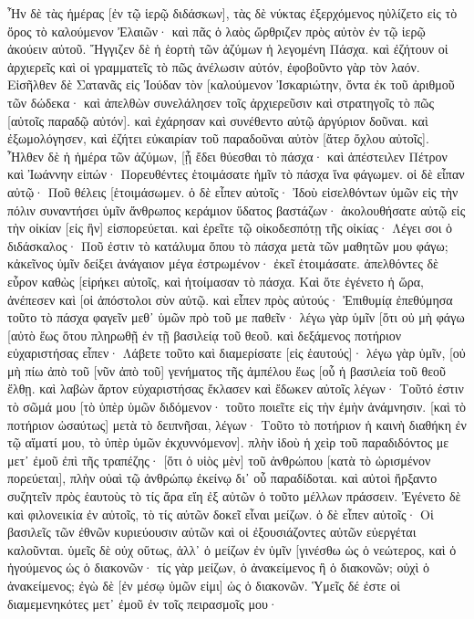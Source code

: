 Ἦν δὲ τὰς ἡμέρας [ἐν τῷ ἱερῷ διδάσκων], τὰς δὲ νύκτας ἐξερχόμενος ηὐλίζετο εἰς τὸ ὄρος τὸ καλούμενον Ἐλαιῶν· 
καὶ πᾶς ὁ λαὸς ὤρθριζεν πρὸς αὐτὸν ἐν τῷ ἱερῷ ἀκούειν αὐτοῦ. 
Ἤγγιζεν δὲ ἡ ἑορτὴ τῶν ἀζύμων ἡ λεγομένη Πάσχα. 
καὶ ἐζήτουν οἱ ἀρχιερεῖς καὶ οἱ γραμματεῖς τὸ πῶς ἀνέλωσιν αὐτόν, ἐφοβοῦντο γὰρ τὸν λαόν. 
Εἰσῆλθεν δὲ Σατανᾶς εἰς Ἰούδαν τὸν [καλούμενον Ἰσκαριώτην, ὄντα ἐκ τοῦ ἀριθμοῦ τῶν δώδεκα· 
καὶ ἀπελθὼν συνελάλησεν τοῖς ἀρχιερεῦσιν καὶ στρατηγοῖς τὸ πῶς [αὐτοῖς παραδῷ αὐτόν]. 
καὶ ἐχάρησαν καὶ συνέθεντο αὐτῷ ἀργύριον δοῦναι. 
καὶ ἐξωμολόγησεν, καὶ ἐζήτει εὐκαιρίαν τοῦ παραδοῦναι αὐτὸν [ἄτερ ὄχλου αὐτοῖς]. 
Ἦλθεν δὲ ἡ ἡμέρα τῶν ἀζύμων, [ᾗ ἔδει θύεσθαι τὸ πάσχα· 
καὶ ἀπέστειλεν Πέτρον καὶ Ἰωάννην εἰπών· Πορευθέντες ἑτοιμάσατε ἡμῖν τὸ πάσχα ἵνα φάγωμεν. 
οἱ δὲ εἶπαν αὐτῷ· Ποῦ θέλεις [ἑτοιμάσωμεν. 
ὁ δὲ εἶπεν αὐτοῖς· Ἰδοὺ εἰσελθόντων ὑμῶν εἰς τὴν πόλιν συναντήσει ὑμῖν ἄνθρωπος κεράμιον ὕδατος βαστάζων· ἀκολουθήσατε αὐτῷ εἰς τὴν οἰκίαν [εἰς ἣν] εἰσπορεύεται. 
καὶ ἐρεῖτε τῷ οἰκοδεσπότῃ τῆς οἰκίας· Λέγει σοι ὁ διδάσκαλος· Ποῦ ἐστιν τὸ κατάλυμα ὅπου τὸ πάσχα μετὰ τῶν μαθητῶν μου φάγω; 
κἀκεῖνος ὑμῖν δείξει ἀνάγαιον μέγα ἐστρωμένον· ἐκεῖ ἑτοιμάσατε. 
ἀπελθόντες δὲ εὗρον καθὼς [εἰρήκει αὐτοῖς, καὶ ἡτοίμασαν τὸ πάσχα. 
Καὶ ὅτε ἐγένετο ἡ ὥρα, ἀνέπεσεν καὶ [οἱ ἀπόστολοι σὺν αὐτῷ. 
καὶ εἶπεν πρὸς αὐτούς· Ἐπιθυμίᾳ ἐπεθύμησα τοῦτο τὸ πάσχα φαγεῖν μεθ᾽ ὑμῶν πρὸ τοῦ με παθεῖν· 
λέγω γὰρ ὑμῖν [ὅτι οὐ μὴ φάγω [αὐτὸ ἕως ὅτου πληρωθῇ ἐν τῇ βασιλείᾳ τοῦ θεοῦ. 
καὶ δεξάμενος ποτήριον εὐχαριστήσας εἶπεν· Λάβετε τοῦτο καὶ διαμερίσατε [εἰς ἑαυτούς]· 
λέγω γὰρ ὑμῖν, [οὐ μὴ πίω ἀπὸ τοῦ [νῦν ἀπὸ τοῦ] γενήματος τῆς ἀμπέλου ἕως [οὗ ἡ βασιλεία τοῦ θεοῦ ἔλθῃ. 
καὶ λαβὼν ἄρτον εὐχαριστήσας ἔκλασεν καὶ ἔδωκεν αὐτοῖς λέγων· Τοῦτό ἐστιν τὸ σῶμά μου [τὸ ὑπὲρ ὑμῶν διδόμενον· τοῦτο ποιεῖτε εἰς τὴν ἐμὴν ἀνάμνησιν. 
[καὶ τὸ ποτήριον ὡσαύτως] μετὰ τὸ δειπνῆσαι, λέγων· Τοῦτο τὸ ποτήριον ἡ καινὴ διαθήκη ἐν τῷ αἵματί μου, τὸ ὑπὲρ ὑμῶν ἐκχυννόμενον]. 
πλὴν ἰδοὺ ἡ χεὶρ τοῦ παραδιδόντος με μετ᾽ ἐμοῦ ἐπὶ τῆς τραπέζης· 
[ὅτι ὁ υἱὸς μὲν] τοῦ ἀνθρώπου [κατὰ τὸ ὡρισμένον πορεύεται], πλὴν οὐαὶ τῷ ἀνθρώπῳ ἐκείνῳ δι᾽ οὗ παραδίδοται. 
καὶ αὐτοὶ ἤρξαντο συζητεῖν πρὸς ἑαυτοὺς τὸ τίς ἄρα εἴη ἐξ αὐτῶν ὁ τοῦτο μέλλων πράσσειν. 
Ἐγένετο δὲ καὶ φιλονεικία ἐν αὐτοῖς, τὸ τίς αὐτῶν δοκεῖ εἶναι μείζων. 
ὁ δὲ εἶπεν αὐτοῖς· Οἱ βασιλεῖς τῶν ἐθνῶν κυριεύουσιν αὐτῶν καὶ οἱ ἐξουσιάζοντες αὐτῶν εὐεργέται καλοῦνται. 
ὑμεῖς δὲ οὐχ οὕτως, ἀλλ᾽ ὁ μείζων ἐν ὑμῖν [γινέσθω ὡς ὁ νεώτερος, καὶ ὁ ἡγούμενος ὡς ὁ διακονῶν· 
τίς γὰρ μείζων, ὁ ἀνακείμενος ἢ ὁ διακονῶν; οὐχὶ ὁ ἀνακείμενος; ἐγὼ δὲ [ἐν μέσῳ ὑμῶν εἰμι] ὡς ὁ διακονῶν. 
Ὑμεῖς δέ ἐστε οἱ διαμεμενηκότες μετ᾽ ἐμοῦ ἐν τοῖς πειρασμοῖς μου· 
